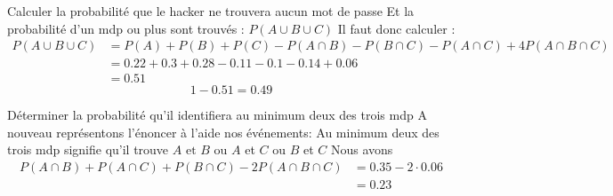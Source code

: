 \begin{exo}
\begin{subexo}{Calculer la probabilité que le hacker ne trouvera aucun mot de passe}
        Et la probabilité  d'un mdp ou plus sont trouvés : $P(A\cup B \cup C)$
        \newline Il faut donc calculer : 
        \begin{align*}
            P(A\cup B \cup C) &= P(A) + P(B) + P(C) - P(A\cap B) - P(B\cap C) - P(A\cap C) + 4P(A\cap B \cap C)\\
            &= 0.22 + 0.3 + 0.28 - 0.11 -0.1 - 0.14 + 0.06\\
            &= 0.51
        \end{align*}
        $$ 1- 0.51 = 0.49 $$
    \end{subexo}
    \begin{subexo}{Déterminer la probabilité qu'il identifiera au minimum deux des trois mdp}
        A nouveau représentons l'énoncer à l'aide nos événements:
        Au minimum deux des trois mdp signifie qu'il trouve $A\text{ et } B $ ou $A$ et $C$ ou $B$ et $C$
        Nous avons \begin{align*}
            P(A\cap B) + P(A\cap C) + P(B \cap C) - 2P(A\cap B \cap C) &= 0.35-2\cdot 0.06\\
            &= 0.23
        \end{align*}
    \end{subexo}
\end{exo}